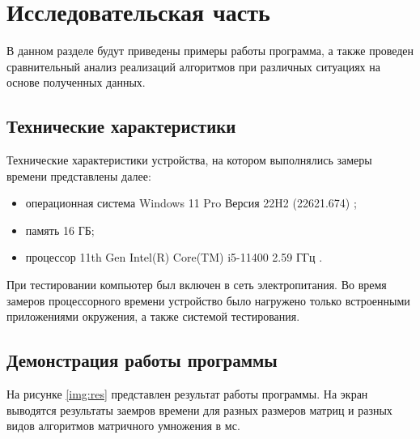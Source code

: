 \chapter{Исследовательская часть}

В данном разделе будут приведены примеры работы программа, а также проведен сравнительный анализ реализаций алгоритмов при различных ситуациях на основе полученных данных.

\section{Технические характеристики}

Технические характеристики устройства, на котором выполнялись замеры времени представлены далее:

\begin{itemize}
	\item операционная система Windows 11 Pro Версия 22H2 (22621.674) \cite{wind};
	\item память 16 ГБ;
	\item процессор 11th Gen Intel(R) Core(TM) i5-11400 2.59 ГГц \cite{proc}.
\end{itemize}

При тестировании компьютер был включен в сеть электропитания. Во время замеров процессорного времени устройство было нагружено только встроенными приложениями окружения, а также системой тестирования.

\section{Демонстрация работы программы}

На рисунке \ref{img:res} представлен результат работы программы. На экран выводятся результаты заемров времени для разных размеров матриц и разных видов алгоритмов матричного умножения в мс.
\newpage
%
\begin{center}
	\label{img:res}
\end{center}

